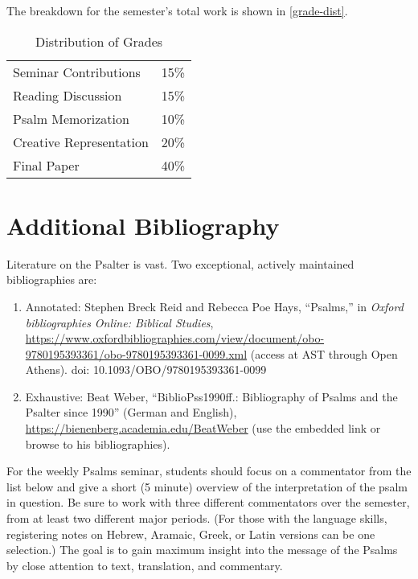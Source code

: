\documentclass[titlepage]{article}
\newcommand\policy{../policy}
\begin{document}
The breakdown for the semester's total work is shown in
\autoref{grade-dist}.

\begin{table}[htbp]
  \centering
  {\lining
  \begin{tabular}{lr}
    \toprule
    Seminar Contributions   & 15\% \\
    Reading Discussion      & 15\% \\
    Psalm Memorization      & 10\% \\
    Creative Representation & 20\% \\
    Final Paper             & 40\% \\
    \bottomrule
  \end{tabular}}
  \caption{Distribution of Grades}
  \label{grade-dist}
\end{table}




\section{Additional Bibliography}
\label{bibliography}

Literature on the Psalter is vast. Two exceptional, actively maintained bibliographies are:

\begin{enumerate}
	\item Annotated: Stephen Breck Reid and Rebecca Poe Hays, “Psalms,” in \emph{Oxford bibliographies Online: Biblical Studies}, \href{https://go.openathens.net/redirector/astheology.ns.ca?url=https://www.oxfordbibliographies.com/view/document/obo-9780195393361/obo-9780195393361-0099.xml}{https://www.oxfordbibliographies.com/view/document/obo-9780195393361/obo-9780195393361-0099.xml} (access at AST through Open Athens). doi: 10.1093/OBO/9780195393361-0099
	\item Exhaustive: Beat Weber, “BiblioPss1990ff.: Bibliography of Psalms and the Psalter since 1990” (German and English), \href{https://www.academia.edu/5910732/BiblioPss1990ff_Bibliography_of_Psalms_and_the_Psalter_since_1990}{https://bienenberg.academia.edu/BeatWeber} (use the embedded link or browse to his bibliographies).

\end{enumerate}

For the weekly Psalms seminar, students should focus on a commentator
from the list below and give a short (5 minute) overview of the
interpretation of the psalm in question. Be sure to work with three
different commentators over the semester, from at least two different
major periods. (For those with the language skills, registering notes on
Hebrew, Aramaic, Greek, or Latin versions can be one selection.) The
goal is to gain maximum insight into the message of the Psalms by close
attention to text, translation, and commentary.
\end{document}
